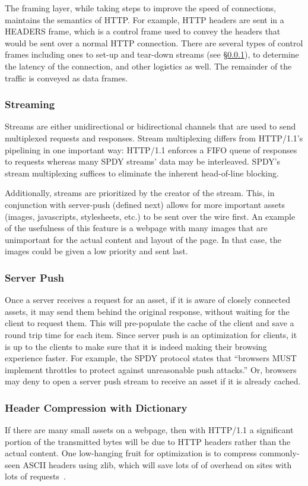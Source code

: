\documentclass[10pt,letterpaper,notitlepage]{article}
\begin{document}
The framing layer, while taking steps to improve the speed of connections,
maintains the semantics of HTTP.  For example, HTTP headers are sent in a
HEADERS frame, which is a control frame used to convey the headers that would
be sent over a normal HTTP connection.  There are several types of control
frames including ones to set-up and tear-down streams (see
\S\ref{sec:background/spdy/streaming}), to determine the latency of the
connection, and other logistics as well.  The remainder of the traffic is
conveyed as data frames.

\subsubsection{Streaming}
\label{sec:background/spdy/streaming}
Streams are either unidirectional or bidirectional channels that are used to
send multiplexed requests and responses.  Stream multiplexing differs from
HTTP/1.1's pipelining in one important way: HTTP/1.1 enforces a FIFO queue of
responses to requests whereas many SPDY streams' data may be interleaved.
SPDY's stream multiplexing suffices to eliminate the inherent head-of-line
blocking.

Additionally, streams are prioritized by the creator of the stream.  This, in
conjunction with server-push (defined next) allows for more important assets
(images, javascripts, stylesheets, etc.) to be sent over the wire first.  An
example of the usefulness of this feature is a webpage with many images that
are unimportant for the actual content and layout of the page.  In that case,
the images could be given a low priority and sent last.

\subsubsection{Server Push}
Once a server receives a request for an asset, if it is aware
of closely connected assets, it may send them behind the original response,
without waiting for the client to request them.  This will pre-populate the
cache of the client and save a round trip time for each item. Since server push
is an optimization for clients, it is up to the clients to make sure that it is
indeed making their browsing experience faster. For example, the SPDY
protocol\cite{spdy3} states that ``browsers MUST implement throttles to
protect against unreasonable push attacks.'' Or, browsers may deny to open a
server push stream to receive an asset if it is already cached.

\subsubsection{Header Compression with Dictionary}
If there are many small assets on a webpage, then with HTTP/1.1 a significant
portion of the transmitted bytes will be due to HTTP headers rather than the
actual content. One low-hanging fruit for optimization is to compress
commonly-seen ASCII headers using zlib, which will save lots of of overhead on
sites with lots of requests~\cite{binoy}.
\end{document}
